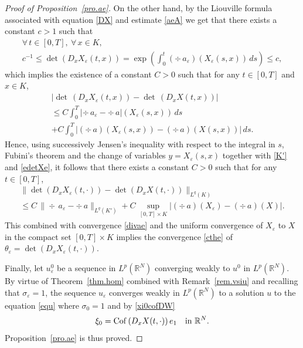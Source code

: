 \documentclass[JEP,XML,SOM,Unicode]{cedram}
\def \RR {\mathbb R}
\theoremstyle{plain}
\theoremstyle{definition}
\begin{document}
\begin{proof}[Proof of Proposition~\ref{pro.ae}]
On the other hand, by the Liouville formula associated with equation \eqref{DX} and estimate \eqref{aeA} we get that there exists a constant $c>1$ such that
\begin{multline}\label{edetXe}
\forall\,t\in[0,T],\ \forall\,x\in K,\\[-5pt]
c^{-1}\leq \det\left(D_xX_\varepsilon(t,x)\right)=\exp\left(\int_0^t (\div\,a_\varepsilon)(X_\varepsilon(s,x))\,ds\right)\leq c,
\end{multline}
which implies the existence of a constant $C>0$ such that for any $t\in[0,T]$ and $x\in K$,
\begin{multline*}
\big|\det\,(D_xX_\varepsilon(t,x))-\det\,(D_xX(t,x))\big|
\\
\leq C\int_0^T\!\!|\div\,a_\varepsilon-\div\,a|(X_\varepsilon(s,x))\,ds\\[-5pt]
+C\int_0^T\!\!\big|(\div\,a)(X_\varepsilon(s,x))-(\div\,a)(X(s,x))\big|\,ds.
\end{multline*}
Hence, using successively Jensen's inequality with respect to the integral in $s$, Fubini's theorem and the change of variables $y=X_\varepsilon(s,x)$ together with \eqref{K'} and \eqref{edetXe}, it follows that there exists a constant $C>0$ such that for any $t\in[0,T]$,
\begin{multline*}
\big\|\det\left(D_x X_\varepsilon(t,\cdot)\right)-\det\left(D_x X(t,\cdot)\right)\big\|_{L^q(K)}
\\
\leq C\,\|\div\,a_\varepsilon-\div\,a\|_{L^q(K')}+C\,\sup_{[0,T]\times K}\big|(\div\,a)(X_\varepsilon)-(\div\,a)(X)\big|.
\end{multline*}
This combined with convergence \eqref{divae} and the uniform convergence of $X_\varepsilon$ to $X$ in the compact set $[0,T]\times K$ implies the convergence \eqref{cthe} of $\theta_\varepsilon=\det (D_xX_\varepsilon(t,\cdot))$.

Finally, let $u_\varepsilon^0$ be a sequence in $L^p(\RR^N)$ converging weakly to $u^0$ in $L^p(\RR^N)$. By virtue of Theorem~\ref{thm.hom} combined with Remark~\ref{rem.vsiu} and recalling that $\sigma_\varepsilon=1$, the sequence $u_\varepsilon$ converges weakly in $L^p(\RR^N)$ to a solution $u$ to the equation \eqref{equ} where $\sigma_0=1$ and by \eqref{xi0cofDW}
\[
\xi_0={\rm Cof}\,(D_x X(t,\cdot))\,e_1\quad\mbox{in }\RR^N.
\]
Proposition~\ref{pro.ae} is thus proved.
\end{proof}

\backmatter


\end{document}
